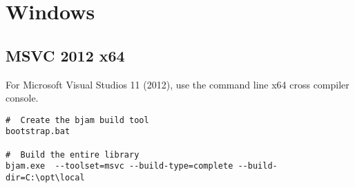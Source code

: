 \documentclass[12pt]{report}
\begin{document}
\section*{Windows}

\subsection*{MSVC 2012 x64}
For Microsoft Visual Studios 11 (2012), use the command line x64 cross
compiler console.

\begin{verbatim}
#  Create the bjam build tool
bootstrap.bat

#  Build the entire library
bjam.exe  --toolset=msvc --build-type=complete --build-dir=C:\opt\local
\end{verbatim}
\end{document}
